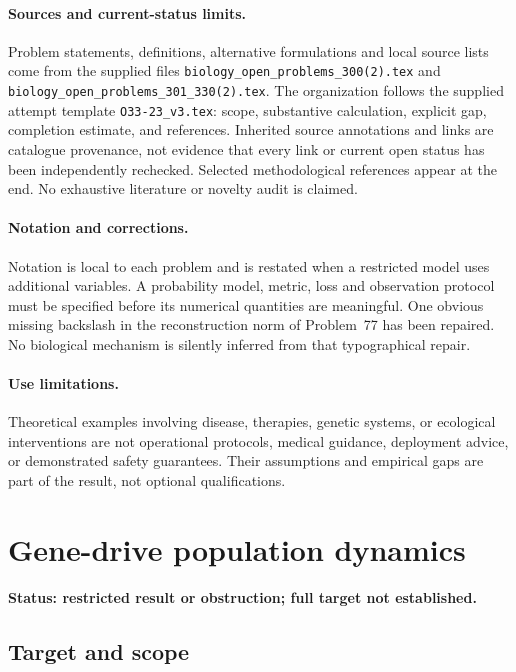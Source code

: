 \documentclass[11pt]{article}
\begin{document}
\paragraph{Sources and current-status limits.}
Problem statements, definitions, alternative formulations and local source lists
come from the supplied files
\texttt{biology\_open\_problems\_300(2).tex} and
\texttt{biology\_open\_problems\_301\_330(2).tex}.
The organization follows the supplied attempt template
\texttt{O33-23\_v3.tex}: scope, substantive calculation, explicit gap,
completion estimate, and references. Inherited source annotations and links are
catalogue provenance, not evidence that every link or current open status has
been independently rechecked. Selected methodological references appear at the
end. No exhaustive literature or novelty audit is claimed.

\paragraph{Notation and corrections.}
Notation is local to each problem and is restated when a restricted model uses
additional variables. A probability model, metric, loss and observation protocol
must be specified before its numerical quantities are meaningful. One obvious
missing backslash in the reconstruction norm of Problem~77 has been repaired.
No biological mechanism is silently inferred from that typographical repair.

\paragraph{Use limitations.}
Theoretical examples involving disease, therapies, genetic systems, or ecological
interventions are not operational protocols, medical guidance, deployment advice,
or demonstrated safety guarantees. Their assumptions and empirical gaps are part
of the result, not optional qualifications.


\section*{Gene-drive population dynamics}
\label{prob:174}
\noindent\textbf{Status: restricted result or obstruction; full target not established.}
\subsection{Target and scope}
\end{document}
